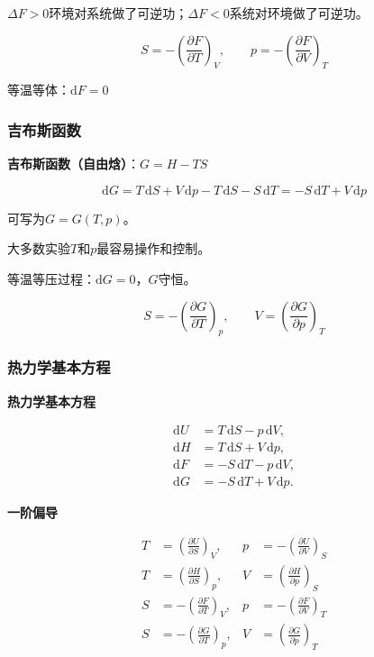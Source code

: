 \documentclass[UTF8]{ctexart}
\theoremstyle{definition}
\begin{document}
$\Delta F > 0$环境对系统做了可逆功；$\Delta F < 0$系统对环境做了可逆功。

\begin{equation}
S = -\left(\frac{\partial F}{\partial T}\right)_V,\qquad p = -\left(\frac{\partial F}{\partial V}\right)_T
\end{equation}

等温等体：$\mathrm{d}F = 0$

\subsubsection*{吉布斯函数}

\textbf{吉布斯函数（自由焓）}：$G = H - TS$

\begin{equation}
\mathrm{d}G = T\,\mathrm{d}S + V\,\mathrm{d}p - T\,\mathrm{d}S - S\,\mathrm{d}T = -S\,\mathrm{d}T + V\,\mathrm{d}p
\end{equation}

可写为$G = G(T,p)$。

大多数实验$T$和$p$最容易操作和控制。

等温等压过程：$\mathrm{d}G = 0$，$G$守恒。

\begin{equation}
S = -\left(\frac{\partial G}{\partial T}\right)_p,\qquad V = \left(\frac{\partial G}{\partial p}\right)_T
\end{equation}

\subsubsection*{热力学基本方程}

\textbf{热力学基本方程}

\begin{equation}
\boxed{
\begin{aligned}
\mathrm{d}U &= T\,\mathrm{d}S - p\,\mathrm{d}V, \\
\mathrm{d}H &= T\,\mathrm{d}S + V\,\mathrm{d}p, \\
\mathrm{d}F &= -S\,\mathrm{d}T - p\,\mathrm{d}V, \\
\mathrm{d}G &= -S\,\mathrm{d}T + V\,\mathrm{d}p.
\end{aligned}
}
\end{equation}

\textbf{一阶偏导}

\begin{align}
T &= \left(\frac{\partial U}{\partial S}\right)_V, & p &= -\left(\frac{\partial U}{\partial V}\right)_S \\[4pt]
T &= \left(\frac{\partial H}{\partial S}\right)_p, & V &= \left(\frac{\partial H}{\partial p}\right)_S \\[4pt]
S &= -\left(\frac{\partial F}{\partial T}\right)_V, & p &= -\left(\frac{\partial F}{\partial V}\right)_T \\[4pt]
S &= -\left(\frac{\partial G}{\partial T}\right)_p, & V &= \left(\frac{\partial G}{\partial p}\right)_T
\end{align}
\end{document}
